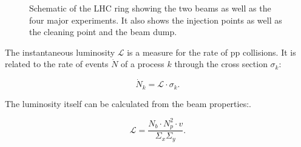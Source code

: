 \begin{figure}[htbp!]
  \begin{center}

\caption{Schematic of the LHC ring showing the two beams as well as the four major experiments. It also shows the injection points as well as the cleaning point and the beam dump. \cite{1748-0221-3-08-S08001}
  \label{fig:det_LHC}}
  \end{center}
\end{figure}

The instantaneous luminosity $\mathcal{L}$ is a measure for the rate of pp collisions.
It is related to the rate of events $\dot N$ of a process $k$ through the cross section $\sigma_k$:

\begin{equation}
\dot N_k = \mathcal{L} \cdot \sigma_k.
\end{equation}

The luminosity itself can be calculated from the beam properties:.

\begin{equation}
\mathcal{L} = \frac{N_b \cdot N_p^2 \cdot v}{\Sigma_x \Sigma_y}.
\end{equation}


